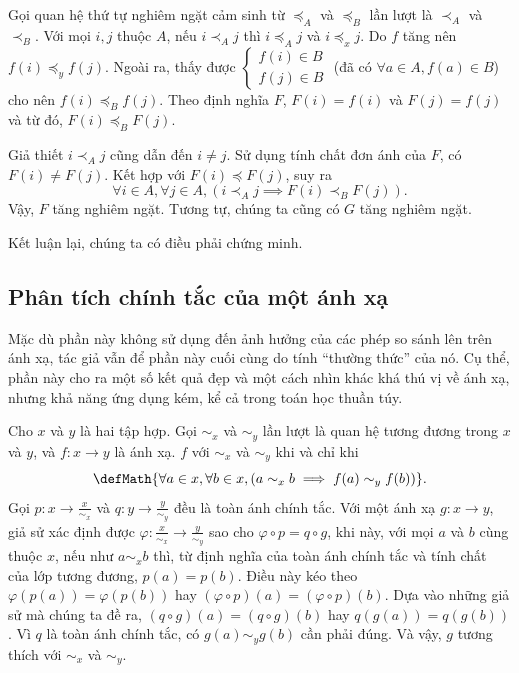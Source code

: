 Gọi quan hệ thứ tự nghiêm ngặt cảm sinh từ $\preccurlyeq_A$ và $\preccurlyeq_B$ lần lượt là $\prec_A$ và $\prec_B$. Với mọi $i, j$ thuộc $A$, nếu $i \prec_A j$ thì $i \preccurlyeq_A j$ và $i \preccurlyeq_x j$. Do $f$ tăng nên $f(i) \preccurlyeq_y f(j)$. Ngoài ra, thấy được $\begin{cases}
   f(i) \in B \\
   f(j) \in B
\end{cases}$ (đã có $\forall a \in A, f(a) \in B$) cho nên $f(i) \preccurlyeq_B f(j)$. Theo định nghĩa $F$, $F(i) = f(i)$ và $F(j) = f(j)$ và từ đó, $F(i) \preccurlyeq_B F(j)$. 

Giả thiết $i \prec_A j$ cũng dẫn đến $i \neq j$. Sử dụng tính chất đơn ánh của $F$, có $F(i) \neq F(j)$. Kết hợp với $F(i) \preccurlyeq F(j)$, suy ra \begin{equation*}
   \forall i \in A, \forall j \in A, (i \prec_A j \implies F(i) \prec_B F(j)).
\end{equation*}
Vậy, $F$ tăng nghiêm ngặt. Tương tự, chúng ta cũng có $G$ tăng nghiêm ngặt.

Kết luận lại, chúng ta có điều phải chứng minh.

\subsection{Phân tích chính tắc của một ánh xạ}

Mặc dù phần này không sử dụng đến ảnh hưởng của các phép so sánh lên trên ánh xạ, tác giả vẫn để phần này cuối cùng do tính ``thường thức'' của nó. Cụ thể, phần này cho ra một số kết quả đẹp và một cách nhìn khác khá thú vị về ánh xạ, nhưng khả năng ứng dụng kém, kể cả trong toán học thuần túy.

Cho $x$ và $y$ là hai tập hợp. Gọi $\sim_x$ và $\sim_y$ lần lượt là quan hệ tương đương trong $x$ và $y$, và $f: x \to y$ là ánh xạ. $f$  với $\sim_x$ và $\sim_y$ khi và chỉ khi \begin{equation*}
   \defMath{\forall a \in x, \forall b \in x, (a \sim_x b \implies f(a)\sim_y f(b))}.
\end{equation*}
Gọi $p: x \to \frac{x}{\sim_x}$ và $q: y \to \frac{y}{\sim_y}$ đều là toàn ánh chính tắc. Với một ánh xạ $g: x \to y$, giả sử xác định được $\varphi: \frac{x}{\sim_x} \to \frac{y}{\sim_y}$ sao cho $\varphi \circ p = q \circ g$, khi này, với mọi $a$ và $b$ cùng thuộc $x$, nếu như $a \sim_x b$ thì, từ định nghĩa của toàn ánh chính tắc và tính chất của lớp tương đương, $p(a) = p(b)$. Điều này kéo theo $\varphi(p(a)) = \varphi(p(b))$ hay $(\varphi \circ p)(a) = (\varphi \circ p)(b)$. Dựa vào những giả sử mà chúng ta đề ra, $(q \circ g)(a) = (q \circ g)(b)$ hay $q(g(a)) = q(g(b))$. Vì $q$ là toàn ánh chính tắc, có $g(a) \sim_y g(b)$ cần phải đúng. Và vậy, $g$ tương thích với $\sim_x$ và $\sim_y$. 

